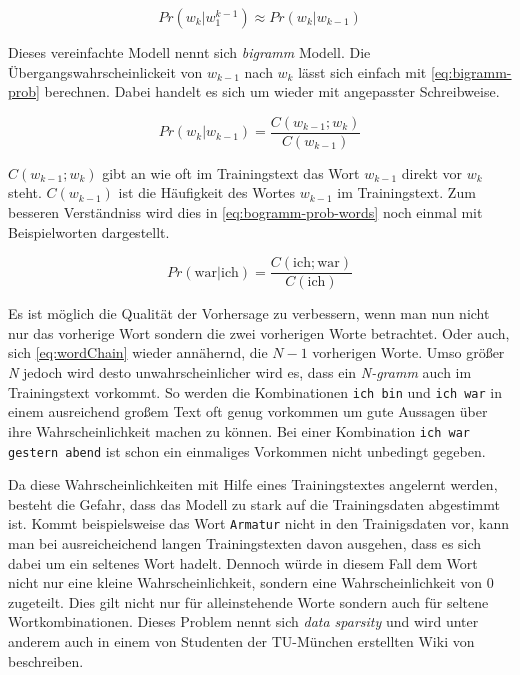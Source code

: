         \begin{equation}
        	Pr(w_k|w_1^{k-1}) \approx Pr(w_k|w_{k-1})
        	\label{eq:markov-assumtion}
        \end{equation}
        
        Dieses vereinfachte Modell nennt sich \emph{bigramm} Modell. Die Übergangswahrscheinlickeit von \(w_{k-1}\) nach \(w_k\) lässt sich einfach mit \autoref{eq:bigramm-prob} berechnen. Dabei handelt es sich um \parencite[Abs.  3.8, Gleichung 3.9]{nlwp:book} wieder mit angepasster Schreibweise.
        
        \begin{equation}
        	Pr(w_k|w_{k-1}) = \frac{C(w_{k-1};w_k)}{C(w_{k-1})}
        	\label{eq:bigramm-prob}
        \end{equation}
    	
    	\(C(w_{k-1};w_k)\) gibt an wie oft im Trainingstext das Wort \(w_{k-1}\) direkt vor \(w_k\) steht. \(C(w_{k-1})\) ist die Häufigkeit des Wortes \(w_{k-1}\) im Trainingstext. Zum besseren Verständniss wird dies in \autoref{eq:bogramm-prob-words} noch einmal mit Beispielworten dargestellt.
        
        \begin{equation}
        	Pr(\text{war}|\text{ich}) = \frac{C(\text{ich};\text{war})}{C(\text{ich})}
        	\label{eq:bogramm-prob-words}
        \end{equation}
        
        
        Es ist möglich die Qualität der Vorhersage zu verbessern, wenn man nun nicht nur das vorherige Wort sondern die zwei vorherigen Worte betrachtet. Oder auch, sich \autoref{eq:wordChain} wieder annähernd, die \(N - 1\) vorherigen Worte. Umso größer \emph{N} jedoch wird desto unwahrscheinlicher wird es, dass ein \emph{N-gramm} auch im Trainingstext vorkommt. So werden die Kombinationen \texttt{ich bin} und \texttt{ich war} in einem ausreichend großem Text oft genug vorkommen um gute Aussagen über ihre Wahrscheinlichkeit machen zu können. Bei einer Kombination \texttt{ich war gestern abend} ist schon ein einmaliges Vorkommen nicht unbedingt gegeben.
        
        Da diese Wahrscheinlichkeiten mit Hilfe eines Trainingstextes angelernt werden, besteht die Gefahr, dass das Modell zu stark auf die Trainingsdaten abgestimmt ist. Kommt beispielsweise das Wort \texttt{Armatur} nicht in den Trainigsdaten vor, kann man bei ausreicheichend langen Trainingstexten davon ausgehen, dass es sich dabei um ein seltenes Wort hadelt. Dennoch würde in diesem Fall dem Wort nicht nur eine kleine Wahrscheinlichkeit, sondern eine Wahrscheinlichkeit von 0 zugeteilt. Dies gilt nicht nur für alleinstehende Worte sondern auch für seltene Wortkombinationen. Dieses Problem nennt sich \emph{data sparsity} und wird unter anderem auch in einem von Studenten der TU-München erstellten Wiki von \parencite[Abs. 5]{recognize-speech:n-gramms} beschreiben. 
        
